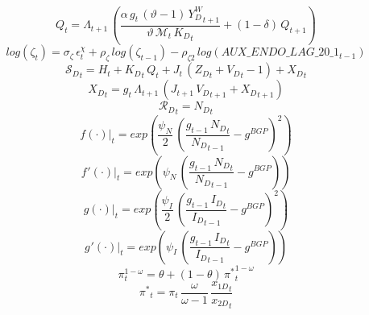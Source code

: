 \documentclass[10pt,a4paper]{article}
\begin{document}
\begin{dmath}
{Q}_{t}={\Lambda}_{t+1}\, \left(\frac{\alpha\, {g}_{t}\, \left(\vartheta-1\right)\, {Y^W_D}_{t+1}}{\vartheta\, \mathcal{M}_{t}\, {K_D}_{t}}+\left(1-\delta\right)\, {Q}_{t+1}\right)
\end{dmath}
\begin{dmath}
log\left({\zeta}_{t}\right)={\sigma}_{\zeta}\, {\epsilon}^{\chi}_{t}+{\rho}_{\zeta}\, log\left({\zeta}_{t-1}\right)-{\rho}_{\zeta2}\, log\left(AUX\_ENDO\_LAG\_20\_1_{t-1}\right)
\end{dmath}
\begin{dmath}
{\mathcal{S}_{D}}_{t}={H}_{t}+{K_D}_{t}\, {Q}_{t}+{J}_{t}\, \left({Z_D}_{t}+{V_D}_{t}-1\right)+{X_D}_{t}
\end{dmath}
\begin{dmath}
{X_D}_{t}={g}_{t}\, {\Lambda}_{t+1}\, \left({J}_{t+1}\, {V_D}_{t+1}+{X_D}_{t+1}\right)
\end{dmath}
\begin{dmath}
{\mathcal{R}_{D}}_{t}={N_D}_{t}
\end{dmath}
\begin{dmath}
{\left.       f\left( \cdot \right)            \right|}_{t}=exp\left(\frac{\psi_N}{2}\, \left(\frac{{g}_{t-1}\, {N_D}_{t}}{{N_D}_{t-1}}-g^{BGP}\right)^{2}\right)
\end{dmath}
\begin{dmath}
{\left.       f^‎{\prime}\left( \cdot \right)   \right|}_{t}=exp\left(\psi_N\, \left(\frac{{g}_{t-1}\, {N_D}_{t}}{{N_D}_{t-1}}-g^{BGP}\right)\right)
\end{dmath}
\begin{dmath}
{\left.       g\left( \cdot \right)            \right|}_{t}=exp\left(\frac{\psi_I}{2}\, \left(\frac{{g}_{t-1}\, {I_D}_{t}}{{I_D}_{t-1}}-g^{BGP}\right)^{2}\right)
\end{dmath}
\begin{dmath}
{\left.       g^‎{\prime}\left( \cdot \right)   \right|}_{t}=exp\left(\psi_I\, \left(\frac{{g}_{t-1}\, {I_D}_{t}}{{I_D}_{t-1}}-g^{BGP}\right)\right)
\end{dmath}
\begin{dmath}
{\pi}_{t}^{1-{\omega}}={\theta}+\left(1-{\theta}\right)\, {\pi^*}_{t}^{1-{\omega}}
\end{dmath}
\begin{dmath}
{\pi^*}_{t}={\pi}_{t}\, \frac{{\omega}}{{\omega}-1}\, \frac{{x_{1D}}_{t}}{{x_{2D}}_{t}}
\end{dmath}
\end{document}
